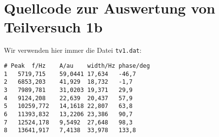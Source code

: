 
\section{\gnuplot{} Quellcode zur Auswertung von Teilversuch 1b}
    Wir verwenden hier immer die Datei \texttt{tv1.dat}:
        \begin{verbatim}
# Peak  f/Hz    A/au    width/Hz phase/deg
1   5719,715    59,0441 17,634   -46,7
2   6853,203    41,929  18,732   -1,7
3   7989,781    31,0203 19,371   29,9
4   9124,208    22,639  20,437   57,9
5   10259,772   14,1618 22,807   63,8
6   11393,832   13,2206 23,386   90,7
7   12524,178   9,5492  27,648   98,3
8   13641,917   7,4138  33,978   133,8
        \end{verbatim}
    
    

